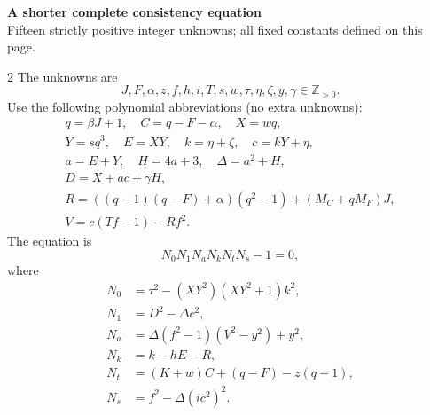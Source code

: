 \documentclass[10pt]{article}
\begin{document}
\begin{center}
{\large\bfseries A shorter complete consistency equation}\\[-1pt]
{\small Fifteen strictly positive integer unknowns; all fixed constants defined on this page.}
\end{center}
\vspace{-7pt}
\begin{multicols}{2}
\small
The unknowns are
\[
 J,F,\alpha,z,f,h,i,T,s,w,\tau,\eta,\zeta,y,\gamma\in\mathbb Z_{>0}.
\]
Use the following polynomial abbreviations (no extra unknowns):
\[
\begin{gathered}
q=\beta J+1,\quad C=q-F-\alpha,\quad X=wq,\\
Y=sq^3,\quad E=XY,\quad k=\eta+\zeta,\quad c=kY+\eta,\\
a=E+Y,\quad H=4a+3,\quad\Delta=a^2+H,\\
D=X+ac+\gamma H,\\
R=((q-1)(q-F)+\alpha)(q^2-1)+(M_C+qM_F)J,\\
V=c(Tf-1)-Rf^2.
\end{gathered}
\]
The equation is
\[
\boxed{N_0N_1N_aN_kN_tN_s-1=0,}
\]
where
\begin{align*}
N_0&=\tau^2-(XY^2)(XY^2+1)k^2,\\
N_1&=D^2-\Delta c^2,\\
N_a&=\Delta(f^2-1)(V^2-y^2)+y^2,\\
N_k&=k-hE-R,\\
N_t&=(K+w)C+(q-F)-z(q-1),\\
N_s&=f^2-\Delta(ic^2)^2.
\end{align*}


\end{multicols}
\end{document}
